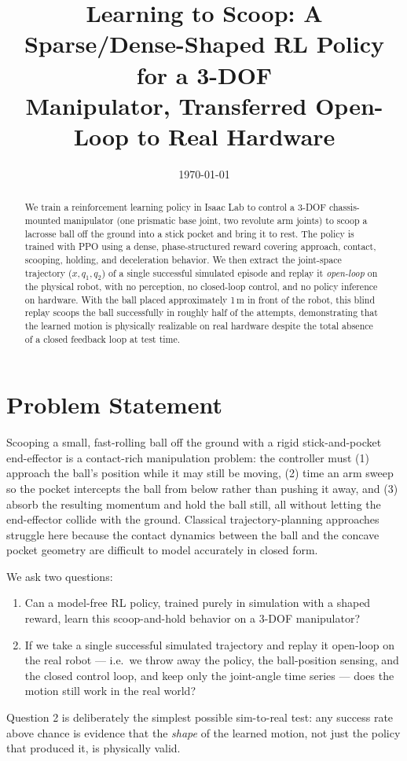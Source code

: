 \documentclass[11pt]{article}
\title{Learning to Scoop: A Sparse/Dense-Shaped RL Policy for a 3-DOF\\
Manipulator, Transferred Open-Loop to Real Hardware}
\author{\todo{your name}}
\date{\today}
\begin{document}
\maketitle

\begin{abstract}
We train a reinforcement learning policy in Isaac Lab to control a 3-DOF
chassis-mounted manipulator (one prismatic base joint, two revolute arm joints)
to scoop a lacrosse ball off the ground into a stick pocket and bring it to rest.
The policy is trained with PPO using a dense, phase-structured reward covering
approach, contact, scooping, holding, and deceleration behavior. We then extract
the joint-space trajectory ($x, q_1, q_2$) of a single successful simulated
episode and replay it \emph{open-loop} on the physical robot, with no perception,
no closed-loop control, and no policy inference on hardware. With the ball placed
approximately 1\,m in front of the robot, this blind replay scoops the ball
successfully in roughly half of the attempts, demonstrating that the learned
motion is physically realizable on real hardware despite the total absence of a
closed feedback loop at test time.
\end{abstract}

\section{Problem Statement}
\label{sec:problem}

Scooping a small, fast-rolling ball off the ground with a rigid stick-and-pocket
end-effector is a contact-rich manipulation problem: the controller must (1)
approach the ball's position while it may still be moving, (2) time an arm sweep
so the pocket intercepts the ball from below rather than pushing it away, and (3)
absorb the resulting momentum and hold the ball still, all without letting the
end-effector collide with the ground. Classical trajectory-planning approaches
struggle here because the contact dynamics between the ball and the concave
pocket geometry are difficult to model accurately in closed form.

We ask two questions:
\begin{enumerate}
  \item Can a model-free RL policy, trained purely in simulation with a shaped
        reward, learn this scoop-and-hold behavior on a 3-DOF manipulator?
  \item If we take a single successful simulated trajectory and replay it
        open-loop on the real robot --- i.e.\ we throw away the policy, the
        ball-position sensing, and the closed control loop, and keep only the
        joint-angle time series --- does the motion still work in the real
        world?
\end{enumerate}
Question 2 is deliberately the simplest possible sim-to-real test: any success
rate above chance is evidence that the \emph{shape} of the learned motion, not
just the policy that produced it, is physically valid.
\end{document}
